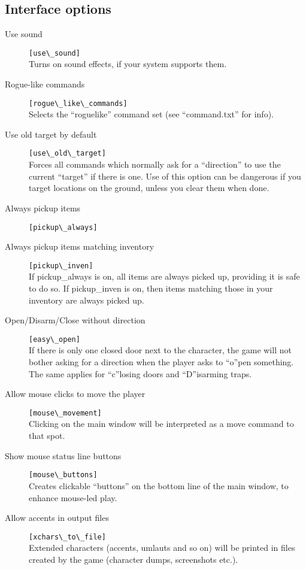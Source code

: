 \subsection{Interface options}
\begin{description}
\item[Use sound] \verb+[use\_sound]+\\
    Turns on sound effects, if your system supports them.

\item[Rogue-like commands] \verb+[rogue\_like\_commands]+\\
    Selects the ``roguelike'' command set (see ``command.txt'' for info).

\item[Use old target by default] \verb+[use\_old\_target]+\\
    Forces all commands which normally ask for a ``direction'' to use the
    current ``target'' if there is one. Use of this option can be dangerous
    if you target locations on the ground, unless you clear them when done.

\item[Always pickup items] \verb+[pickup\_always]+\\
\item[Always pickup items matching inventory] \verb+[pickup\_inven]+\\
If pickup\_always is on, all items are always picked up, providing it is
safe to do so. If pickup\_inven is on, then items matching those in your
inventory are always picked up.

\item[Open/Disarm/Close without direction] \verb+[easy\_open]+\\
    If there is only one closed door next to the character, the game will
    not bother asking for a direction when the player asks to ``o''pen
    something. The same applies for ``c''losing doors and ``D''isarming traps.

\item[Allow mouse clicks to move the player] \verb+[mouse\_movement]+\\
    Clicking on the main window will be interpreted as a move command to
    that spot.

\item[Show mouse status line buttons] \verb+[mouse\_buttons]+\\
    Creates clickable ``buttons'' on the bottom line of the main window, to
    enhance mouse-led play.

\item[Allow accents in output files] \verb+[xchars\_to\_file]+\\
    Extended characters (accents, umlauts and so on) will be printed in
    files created by the game (character dumps, screenshots etc.).
\end{description}

